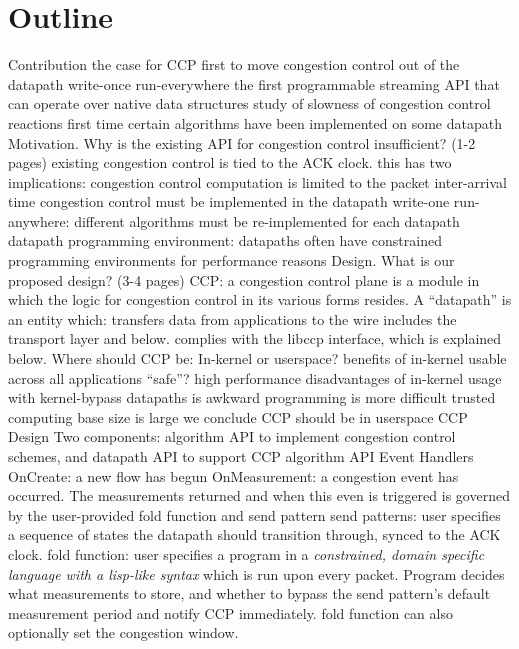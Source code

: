 \section{Outline}

\begin{outline}[enumerate]
\1 Contribution
    \2 the case for CCP
        \3 first to move congestion control out of the datapath
        \3 write-once run-everywhere
    \2 the first programmable streaming API that can operate over native data structures
    \2 study of slowness of congestion control reactions 
    \2 first time certain algorithms have been implemented on some datapath
\1 Motivation. Why is the existing API for congestion control insufficient? (1-2 pages)
    \2 existing congestion control is tied to the ACK clock. this has two implications:
    \2 congestion control computation is limited to the packet inter-arrival time
    \2 congestion control must be implemented in the datapath
        \3 write-one run-anywhere: different algorithms must be re-implemented for each datapath
        \3 datapath programming environment: datapaths often have constrained programming environments for performance reasons
\1 Design. What is our proposed design? (3-4 pages)
    \2 CCP: a congestion control plane is a module in which the logic for congestion control in its various forms resides.
    \2 A ``datapath'' is an entity which:
        \3 transfers data from applications to the wire
        \3 includes the transport layer and below.
        \3 complies with the libccp interface, which is explained below.
    \2 Where should CCP be: In-kernel or userspace?
        \3 benefits of in-kernel
            \4 usable across all applications
            \4 ``safe''?
            \4 high performance
        \3 disadvantages of in-kernel
            \4 usage with kernel-bypass datapaths is awkward
            \4 programming is more difficult
            \4 trusted computing base size is large
        \3 we conclude CCP should be in userspace
    \2 CCP Design
        \3 Two components: algorithm API to implement congestion control schemes, and datapath API to support CCP
        \3 algorithm API
            \4 Event Handlers
            \4 OnCreate: a new flow has begun
            \4 OnMeasurement: a congestion event has occurred. The measurements returned and when this even is triggered is governed by the user-provided fold function and send pattern
            \4 send patterns: user specifies a sequence of states the datapath should transition through, synced to the ACK clock.
            \4 fold function: user specifies a program in a \emph{constrained, domain specific language with a lisp-like syntax} which is run upon every packet. Program decides what measurements to store, and whether to bypass the send pattern's default measurement period and notify CCP immediately. fold function can also optionally set the congestion window.

\end{outline}
